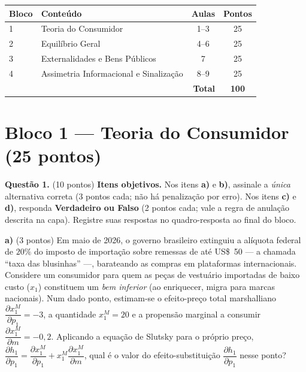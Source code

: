 
\ifsolucao\else
\begin{center}
\renewcommand{\arraystretch}{1.3}
\begin{tabular}{|l|l|c|c|}
\hline
\textbf{Bloco} & \textbf{Conteúdo} & \textbf{Aulas} & \textbf{Pontos} \\ \hline
1 & Teoria do Consumidor & 1--3 & 25 \\ \hline
2 & Equilíbrio Geral & 4--6 & 25 \\ \hline
3 & Externalidades e Bens Públicos & 7 & 25 \\ \hline
4 & Assimetria Informacional e Sinalização & 8--9 & 25 \\ \hline
\multicolumn{3}{|r|}{\textbf{Total}} & \textbf{100} \\ \hline
\end{tabular}
\end{center}
\vspace{0.5em}
\fi


\section*{Bloco 1 --- Teoria do Consumidor \hfill \normalsize (25 pontos)}

\textbf{Questão 1.} (10 pontos) \textbf{Itens objetivos.} Nos itens \textbf{a)} e \textbf{b)}, assinale a \emph{única} alternativa correta (3 pontos cada; não há penalização por erro). Nos itens \textbf{c)} e \textbf{d)}, responda \textbf{Verdadeiro ou Falso} (2 pontos cada; vale a regra de anulação descrita na capa). Registre suas respostas no quadro-resposta ao final do bloco.

\textbf{a)} (3 pontos) Em maio de 2026, o governo brasileiro extinguiu a alíquota federal de $20\%$ do imposto de importação sobre remessas de até US\$~50 --- a chamada ``taxa das blusinhas'' ---, barateando as compras em plataformas internacionais. Considere um consumidor para quem as peças de vestuário importadas de baixo custo ($x_1$) constituem um \emph{bem inferior} (ao enriquecer, migra para marcas nacionais). Num dado ponto, estimam-se o efeito-preço total marshalliano $\dfrac{\partial x_1^{M}}{\partial p_1}=-3$, a quantidade $x_1^{M}=20$ e a propensão marginal a consumir $\dfrac{\partial x_1^{M}}{\partial m}=-0{,}2$. Aplicando a equação de Slutsky para o próprio preço, $\dfrac{\partial h_1}{\partial p_1}=\dfrac{\partial x_1^{M}}{\partial p_1}+x_1^{M}\dfrac{\partial x_1^{M}}{\partial m}$, qual é o valor do efeito-substituição $\dfrac{\partial h_1}{\partial p_1}$ nesse ponto?

